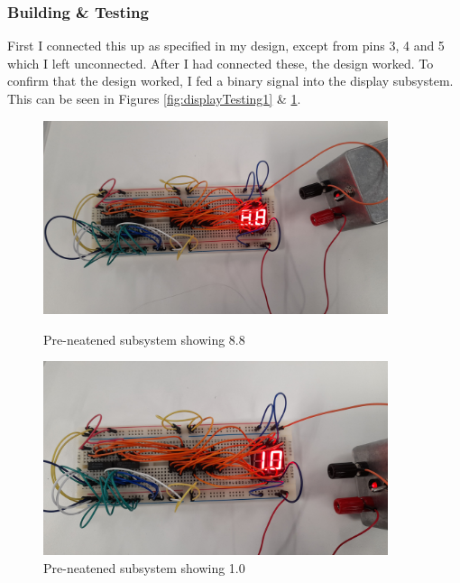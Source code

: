 \subsubsection{Building \& Testing}
First I connected this up as specified in my design, except from pins 3, 4 and 5 which I left unconnected. After I had connected these, the design worked. To confirm that the design worked, I fed a binary signal into the display subsystem. This can be seen in Figures \ref{fig:displayTesting1} \& \ref{fig:displayTesting2}.\newline
\begin{figure} [H]
    \centering
    \begin{minipage}[t]{0.45\textwidth}
        \centering
        \includegraphics[width=0.9\textwidth]{images/displayTesting1.jpg}
        \caption{Pre-neatened subsystem showing 8.8}
        \label{fig:displayTesting1}
    \end{minipage}\hfill
    \begin{minipage}[t] {0.45\textwidth}
        \centering
        \includegraphics[width=0.9\textwidth]{images/displayTesting2.jpg}
        \caption{Pre-neatened subsystem showing 1.0}
         \label{fig:displayTesting2}
    \end{minipage}
\end{figure}
